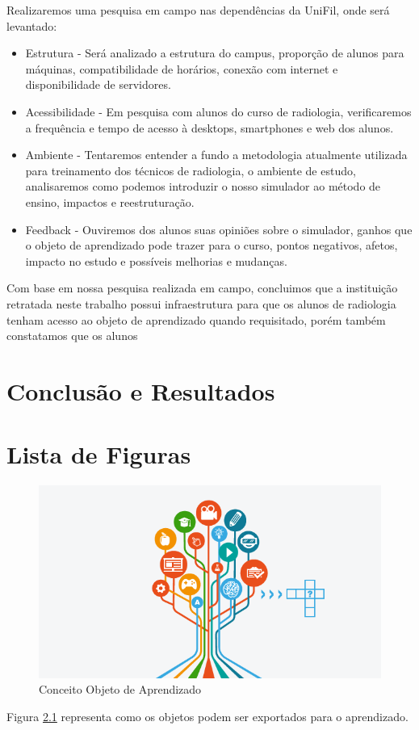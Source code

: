 \documentclass[12pt,openright,oneside,a4paper,english,french,spanish,brazil]{unifil}
\begin{document}
Realizaremos uma pesquisa em campo nas dependências da UniFil, onde será levantado:
\begin{itemize}
\item Estrutura - Será analizado a estrutura do campus, proporção de alunos para máquinas, compatibilidade de horários, conexão com internet e disponibilidade de servidores.
\item Acessibilidade - Em pesquisa com alunos do curso de radiologia, verificaremos a frequência e tempo de acesso à desktops, smartphones e web dos alunos.
\item Ambiente - Tentaremos entender a fundo a metodologia atualmente utilizada para treinamento dos técnicos de radiologia, o ambiente de estudo, analisaremos como podemos introduzir o nosso simulador ao método de ensino, impactos e reestruturação.
\item Feedback - Ouviremos dos alunos suas opiniões sobre o simulador, ganhos que o objeto de aprendizado pode trazer para o curso, pontos negativos, afetos, impacto no estudo e possíveis melhorias e mudanças.
\end{itemize}

Com base em nossa pesquisa realizada em campo, concluimos que a instituição retratada neste trabalho possui infraestrutura para que os alunos de radiologia tenham acesso ao objeto de aprendizado quando requisitado, porém também constatamos que os alunos

\chapter {Conclusão e Resultados}

\chapter{Lista de Figuras}

\begin{figure}[htb]
	\centering
	\includegraphics[scale=0.5]{images/arvore.png}
	\caption{Conceito Objeto de Aprendizado}
	\label{img:arvore}
\end{figure}
Figura \ref{img:arvore} representa como os objetos podem ser exportados para o aprendizado.
\end{document}
